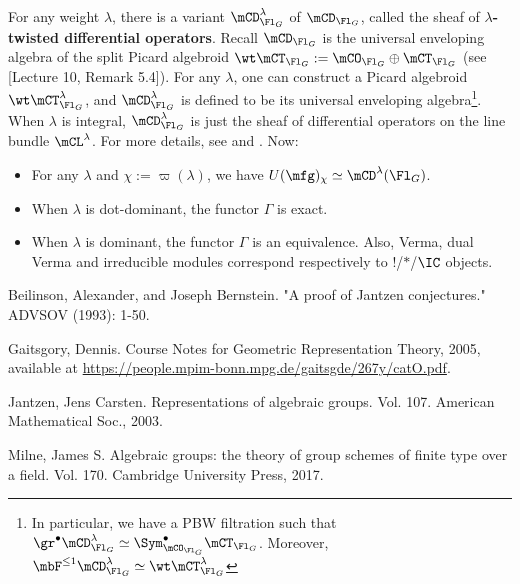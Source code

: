 	For any weight $\lambda$, there is a variant $\mCD_{\Fl_G}^\lambda$ of $\mCD_{\Fl_G}$, called the sheaf of \textbf{$\lambda$-twisted differential operators}. Recall $\mCD_{\Fl_G}$ is the universal enveloping algebra of the split Picard algebroid $\wt\mCT_{\Fl_G}:=\mCO_{\Fl_G} \oplus \mCT_{\Fl_G}$ (see [Lecture 10, Remark 5.4]). For any $\lambda$, one can construct a Picard algebroid $\wt\mCT_{\Fl_G}^\lambda$, and $\mCD_{\Fl_G}^\lambda$ is defined to be its universal enveloping algebra\footnote{In particular, we have a PBW filtration such that $\gr^\bullet \mCD_{\Fl_G}^\lambda \simeq \Sym^\bullet_{\mCO_{\Fl_G}}\mCT_{\Fl_G}$. Moreover, $\mbF^{\le 1} \mCD_{\Fl_G}^\lambda \simeq \wt\mCT_{\Fl_G}^\lambda$}. When $\lambda$ is integral, $\mCD_{\Fl_G}^\lambda$ is just the sheaf of differential operators on the line bundle $\mCL^\lambda$. For more details, see \cite{BB} and \cite[Section 9]{G}. Now:
	\begin{itemize}
		\item 
			For any $\lambda$ and $\chi:=\varpi(\lambda)$, we have $U(\mfg)_{\chi} \simeq \mCD^\lambda(\Fl_G)$.
		\item 
			When $\lambda$ is dot-dominant, the functor $\Gamma$ is exact.
		\item
			When $\lambda$ is dominant, the functor $\Gamma$ is an equivalence. Also, Verma, dual Verma and irreducible modules correspond respectively to $!$/$*$/$\IC$ objects.
	\end{itemize} 
	

	

\begin{thebibliography}{Yau}

	 Beilinson, Alexander, and Joseph Bernstein. "A proof of Jantzen conjectures." ADVSOV (1993): 1-50.

	 Gaitsgory, Dennis. Course Notes for Geometric Representation Theory, 2005, available at \url{https://people.mpim-bonn.mpg.de/gaitsgde/267y/catO.pdf}.

	 Jantzen, Jens Carsten. Representations of algebraic groups. Vol. 107. American Mathematical Soc., 2003.

	 Milne, James S. Algebraic groups: the theory of group schemes of finite type over a field. Vol. 170. Cambridge University Press, 2017.
\end{thebibliography}


 


